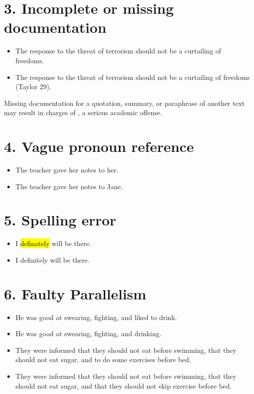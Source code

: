 \section{3. Incomplete or missing documentation} 

\begin{itemize}
\item The response to the threat of terrorism should not be a curtailing of
freedoms. 

\item The response to the threat of terrorism should not be a curtailing of
freedoms (Taylor 29). 
\end{itemize}

\noindent Missing documentation for a quotation, summary, or paraphrase of another text
may result in charges of \hyperlink{plagiarism}{\color{Ahrenge}{plagiarism}}, a serious academic offense.

\section{4. Vague pronoun reference} 
\begin{itemize}
\item The teacher gave her notes to her. 

\item The teacher gave her notes to Jane. 
\end{itemize}


\section{5. Spelling error} 
\begin{itemize}
\item I \hl{definately} will be there. 

\item I definitely will be there. 
\end{itemize}


\section{6. Faulty Parallelism} 
\begin{itemize}
\item He was good at swearing, fighting, and liked to drink. 
\item He was good at swearing, fighting, and drinking. 
\smallskip

\item They were informed that they should not eat before swimming, that they should not eat sugar, and to do some exercises before bed. 

\item They were informed that they should not eat before swimming, that they should not eat sugar, and that they should not skip exercise before bed. 

\end{itemize}

